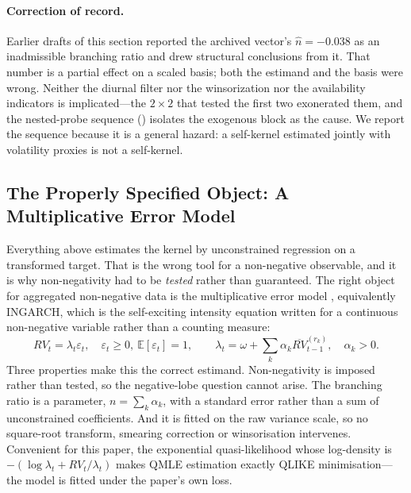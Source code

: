 \paragraph{Correction of record.} Earlier drafts of this section reported the
archived vector's $\hat n = -0.038$ as an inadmissible branching ratio and drew
structural conclusions from it. That number is a partial effect on a scaled
basis; both the estimand and the basis were wrong. Neither the diurnal filter
nor the winsorization nor the availability indicators is implicated---the
$2\times2$ that tested the first two exonerated them, and
the nested-probe sequence () isolates the exogenous block as the cause. We
report the sequence because it is a general hazard: a self-kernel estimated
jointly with volatility proxies is not a self-kernel.

\subsection{The Properly Specified Object: A Multiplicative Error Model}
\label{sec:mem}

Everything above estimates the kernel by unconstrained regression on a
transformed target. That is the wrong tool for a non-negative observable, and
it is why non-negativity had to be \emph{tested} rather than guaranteed. The
right object for aggregated non-negative data is the multiplicative error model
\citep{EngleGallo2006}, equivalently INGARCH, which is the self-exciting
intensity equation written for a continuous non-negative variable rather than a
counting measure:
\begin{equation}
  RV_t = \lambda_t \varepsilon_t, \quad \varepsilon_t \ge 0,\ \mathbb{E}[\varepsilon_t] = 1,
  \qquad
  \lambda_t = \omega + \sum_k \alpha_k \overline{RV}^{(r_k)}_{t-1}, \quad \alpha_k > 0 .
  \label{eq:mem}
\end{equation}
Three properties make this the correct estimand. Non-negativity is imposed
rather than tested, so the negative-lobe question cannot arise. The branching
ratio is a parameter, $n = \sum_k \alpha_k$, with a standard error rather than
a sum of unconstrained coefficients. And it is fitted on the raw variance
scale, so no square-root transform, smearing correction or winsorisation
intervenes. Convenient for this paper, the exponential quasi-likelihood whose
log-density is $-(\log\lambda_t + RV_t/\lambda_t)$ makes QMLE estimation exactly
QLIKE minimisation---the model is fitted under the paper's own loss.

